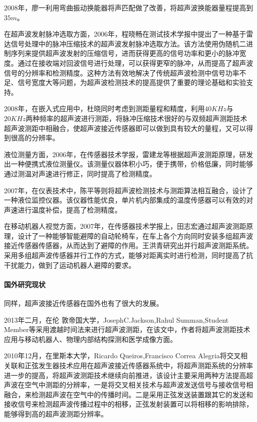 	2008年，廖一利用弯曲振动换能器将声匹配做了改善，将超声波换能器量程提高到$35m$。
	
	在超声波发射脉冲选取方面，2006年，程晓畅在测试技术学报中提出了一种基于雷达信号处理中的脉冲压缩技术的超声波发射脉冲选取方法。该方法使用伪随机二进制序列来提供超声波发射的压缩信号，进而获得更高的信号功率和更小的脉冲宽度。通过在接收端对回波信号进行处理，可以获得更窄的脉冲，从而提高了超声波信号的分辨率和检测精度。这种方法有效地解决了传统超声波检测中信号功率不足、信号宽度大等问题，为超声波检测技术的提高提供了重要的理论基础和实验支持。
	
	2008年，在嵌入式应用中，杜晓同时考虑到测距量程和精度，利用$40KHz$与$20KHz$两种频率的超声波进行测距，将脉冲压缩技术很好的与双频超声测距技术超声波测距中相融合，使超声波接近传感器即可以做到具有较大的量程，又可以得到很高的分辨率。
	
	液位测量方面，2006年，在传感器技术学报，雷建龙等根据超声波测距原理，研发出一种便携式液位测量仪。该测量仪器体积小巧，便于携带，价格低廉，同时能够通过测温对声速进行修正，同时提高了检测精度。
	
	2007年，在仪表技术中，陈平等则将超声波检测技术与测距算法相互融合，设计了一种液位监控仪器。该仪器性能优良，单片机内部集成的温度传感器可以有效的对声速进行温度补偿，提高了检测精度。
	
	在移动机器人视觉方面，2007年，在传感器技术学报上，田志宏通过超声波测距原理，设计了一种能够智能避障的自动轮椅车，在车上各个方向同时安装多组超声波接近传感器传感器，从而达到了避障的作用。王洪青研究出并行超声波测距系统。采用多组超声波传感器并行工作的方式，能够对距离实时进行检测，同时提高了抗干扰能力，做到了运动机器人避障的要求。
	
    \paragraph{国外研究现状}
	同样，超声波接近传感器在国外也有了很大的发展。
	
	2013年二月，在伦	敦帝国大学，JosephC.Jackson,Rahul Summan,Student Member等采用渡越时间法来进行超声波测距，在该文中，作者将超声波测距技术应用与移动机器人、物理内部结构探测和医学成像方面。
	
	2010年12月，在里斯本大学，Ricardo Queiros,Francisco Correa Alegria将交叉相关联和正弦发生器技术应用在超声波接近传感器系统中，将超声测距系统的分辨率进一步的提高，将超声波测距技术继续向前推进，该设计主要采用两种方法提高超声波在空气中测距的分辨率，一是将交叉相关技术与超声波发送信号与接收信号相融合，来检测超声波在空气中的传播时间。二是采用正弦发送装置跟其它的发送和接收信号来检测超声波传播过程中的相移，正弦发射装置可以将相移的影响排除，能够得到高的超声波测距分辨率。
	
